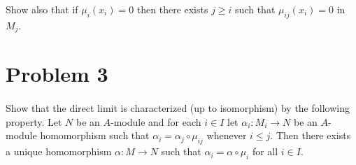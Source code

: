 \documentclass{article}
\begin{document}
Show also that if $\mu_i(x_i)=0$ then there exists $j\geq i$ such that $\mu_{ij}(x_i)=0$ in $M_j$.

\section*{Problem 3}\paragraph{}
Show that the direct limit is characterized (up to isomorphism) by the following property. Let $N$ be an $A$-module and for each $i\in I$ let $\alpha_i :M_i\to N$ be an $A$-module homomorphism such that $\alpha_i = \alpha_j\circ\mu_{ij}$ whenever $i \leq j$. Then there exists a unique homomorphism $\alpha: M\to N$ such that $\alpha_i=\alpha\circ\mu_i$ for all $i\in I$.
\end{document}

